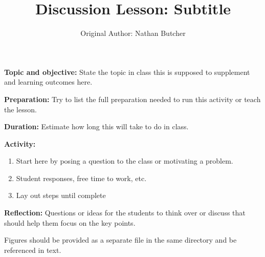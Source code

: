\documentclass{article}
\title{Discussion Lesson: Subtitle}
\author{Original Author: Nathan Butcher}
\date{}
\begin{document}
\maketitle
\thispagestyle{empty}

\textbf{Topic and objective:} State the topic in class this is supposed to supplement and learning outcomes here. 

\textbf{Preparation:} Try to list the full preparation needed to run this activity or teach the lesson.

\textbf{Duration:} Estimate how long this will take to do in class. 

\hspace{14pt}

\textbf{Activity:}
\begin{enumerate}
\item Start here by posing a question to the class or motivating a problem.
\item Student responses, free time to work, etc.
\item Lay out steps until complete
\end{enumerate}

\textbf{Reflection:} Questions or ideas for the students to think over or discuss that should help them focus on the key points.

\hspace{14pt}

Figures should be provided as a separate file in the same directory and be referenced in text.
\end{document}
